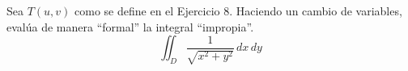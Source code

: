 Sea $T(u,v)$ como se define en el Ejercicio 8. Haciendo un cambio de variables, evalúa de manera “formal” la integral “impropia”.
\[\iint_D \frac{1}{\sqrt{x^2 + y^2}} \, dx \, dy\]
